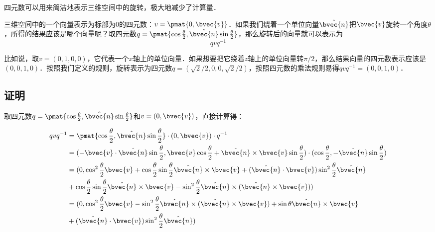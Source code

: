 
\begin{issues}
\issueAbstract
\issueTODO
\end{issues}


四元数可以用来简洁地表示三维空间中的旋转，极大地减少了计算量．

三维空间中的一个向量表示为标部为$0$的四元数：$v=\pmat{0, \bvec{v}}$．如果我们绕着一个单位向量$\hat{\bvec{n}}$把$\bvec{v}$旋转一个角度$\theta$，所得的结果应该是哪个向量呢？取四元数$q=\pmat{\cos{\frac{\theta}{2}}, \hat{\bvec{n}}\sin{\frac{\theta}{2}}}$，那么旋转后的向量就可以表示为
\begin{equation}
qvq^{-1}
\end{equation}

比如说，取$v=(0, 1, 0, 0)$，它代表一个$x$轴上的单位向量．如果想要把它绕着$z$轴上的单位向量转$\pi/2$，那么结果向量的四元数表示应该是$(0, 0, 1, 0)$．按照我们定义的规则，旋转表示为四元数$q=(\sqrt{2}/2, 0, 0, \sqrt{2}/2)$，按照四元数的乘法规则易得$qvq^{-1}=(0,0,1,0)$．

\subsection{证明}

取四元数$q=\pmat{\cos{\frac{\theta}{2}}, \hat{\bvec{n}}\sin{\frac{\theta}{2}}}$和$v=(0, \bvec{v})$，直接计算得：

\begin{equation}
\begin{aligned}
qvq^{-1}&=\pmat{\cos{\frac{\theta}{2}}, \hat{\bvec{n}}\sin{\frac{\theta}{2}}}\cdot (0, \bvec{v})\cdot q^{-1}\\&
=(-\bvec{v}\cdot\hat{\bvec{n}}\sin{\frac{\theta}{2}}, \bvec{v}\cos{\frac{\theta}{2}}+\hat{\bvec{n}}\times\bvec{v}\sin{\frac{\theta}{2}})\cdot (\cos{\frac{\theta}{2}}, -\hat{\bvec{n}}\sin{\frac{\theta}{2}})\\&
=(0, \cos^2\frac{\theta}{2}\bvec{v}+\cos\frac{\theta}{2}\sin\frac{\theta}{2}\hat{\bvec{n}}\times\bvec{v}+(\hat{\bvec{n}}\cdot\bvec{v})\sin^2\frac{\theta}{2}\hat{\bvec{n}}\\&+\cos\frac{\theta}{2}\sin\frac{\theta}{2}\hat{\bvec{n}}\times\bvec{v}-\sin^2\frac{\theta}{2}\hat{\bvec{n}}\times(\hat{\bvec{n}}\times\bvec{v}))\\&
=(0, \cos^2\frac{\theta}{2}\bvec{v}-\sin^2\frac{\theta}{2}\hat{\bvec{n}}\times(\hat{\bvec{n}}\times\bvec{v})+\sin\theta\hat{\bvec{n}}\times\bvec{v}\\&+(\hat{\bvec{n}}\cdot\bvec{v})\sin^2\frac{\theta}{2}\hat{\bvec{n}})
\end{aligned}
\end{equation}

